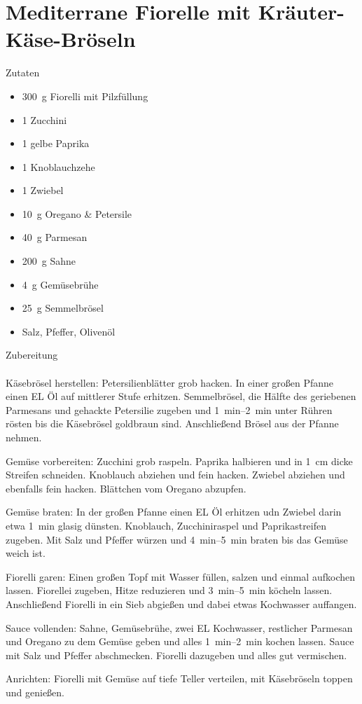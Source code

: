 \section*{Mediterrane Fiorelle mit Kräuter-Käse-Bröseln}
\ihead{}\ohead{}
\cfoot{}
{\Large Zutaten}
\begin{multicols}{2}
\begin{itemize}
    \item \SI{300}{g} Fiorelli mit Pilzfüllung
    \item \num{1} Zucchini
    \item \num{1} gelbe Paprika
    \item \num{1} Knoblauchzehe
    \item \num{1} Zwiebel
    \item \SI{10}{g} Oregano \& Petersile
    \item \SI{40}{g} Parmesan
    \item \SI{200}{g} Sahne
    \item \SI{4}{g} Gemüsebrühe
    \item \SI{25}{g} Semmelbrösel
    \item Salz, Pfeffer, Olivenöl
\end{itemize}
\end{multicols}
\noindent
{\Large Zubereitung}\\
\\
Käsebrösel herstellen: Petersilienblätter grob hacken.
In einer großen Pfanne einen EL Öl auf mittlerer Stufe erhitzen.
Semmelbrösel, die Hälfte des geriebenen Parmesans und gehackte Petersilie zugeben und \SIrange{1}{2}{min} unter Rühren rösten bis die Käsebrösel goldbraun sind. 
Anschließend Brösel aus der Pfanne nehmen.

Gemüse vorbereiten: Zucchini grob raspeln.
Paprika halbieren und in \SI{1}{cm} dicke Streifen schneiden. 
Knoblauch abziehen und fein hacken.
Zwiebel abziehen und ebenfalls fein hacken. 
Blättchen vom Oregano abzupfen.

Gemüse braten: In der großen Pfanne einen EL Öl erhitzen udn Zwiebel darin etwa \SI{1}{min} glasig dünsten. 
Knoblauch, Zucchiniraspel und Paprikastreifen zugeben. 
Mit Salz und Pfeffer würzen und \SIrange{4}{5}{min} braten bis das Gemüse weich ist.

Fiorelli garen: Einen großen Topf mit Wasser füllen, salzen und einmal aufkochen lassen.
Fiorellei zugeben, Hitze reduzieren und \SIrange{3}{5}{min} köcheln lassen.
Anschließend Fiorelli in ein Sieb abgießen und dabei etwas Kochwasser auffangen.

Sauce vollenden: Sahne, Gemüsebrühe, zwei EL Kochwasser, restlicher Parmesan und Oregano zu dem Gemüse geben und alles \SIrange{1}{2}{min} kochen lassen.
Sauce mit Salz und Pfeffer abschmecken.
Fiorelli dazugeben und alles gut vermischen.

Anrichten: Fiorelli mit Gemüse auf tiefe Teller verteilen, mit Käsebröseln toppen und genießen.

